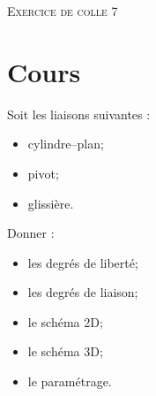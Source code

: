 \documentclass[11pt,oneside]{article}
\begin{document}
\pagestyle{fancy}
\renewcommand{\headrulewidth}{0pt}

\fancyhead{}

\fancyhead[C]{\rule{12cm}{.5pt}}


\renewcommand{\footrulewidth}{0.2pt}

\fancyfoot[C]{\footnotesize{\bfseries \thepage}}


\begin{center}
 \Large\textsc{Exercice de colle 7}
\end{center}

\section{Cours}

\begin{minipage}[c]{.55\linewidth}
Soit les liaisons suivantes :
\begin{itemize}
\item cylindre--plan;
\item pivot;
\item glissière.
\end{itemize}
\end{minipage}\hfill
\begin{minipage}[c]{.55\linewidth}
Donner :
\begin{itemize}
\item les degrés de liberté;
\item les degrés de liaison; 
\item le schéma 2D;
\item le schéma 3D;
\item le paramétrage.
\end{itemize}
\end{minipage}
\end{document}
